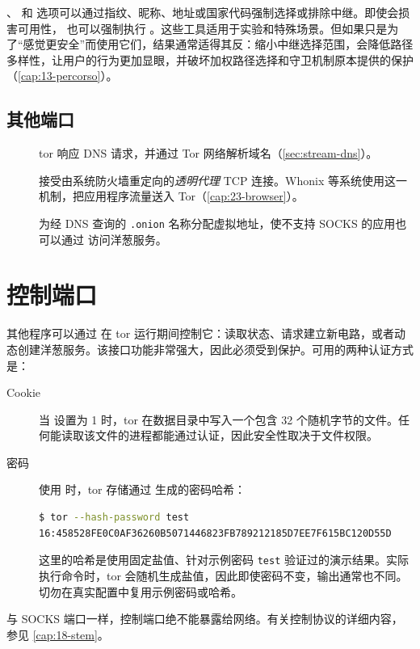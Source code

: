 、 和  选项可以通过指纹、昵称、地址或国家代码强制选择或排除中继。即使会损害可用性， 也可以强制执行 。这些工具适用于实验和特殊场景。但如果只是为了\enquote{感觉更安全}而使用它们，结果通常适得其反：缩小中继选择范围，会降低路径多样性，让用户的行为更加显眼，并破坏加权路径选择和守卫机制原本提供的保护（\cref{cap:13-percorso}）。

\subsection{其他端口}

\begin{description}
  \item[] tor 响应 DNS 请求，并通过 Tor 网络解析域名（\cref{sec:stream-dns}）。
  \item[] 接受由系统防火墙重定向的\emph{透明代理} TCP 连接。Whonix 等系统使用这一机制，把应用程序流量送入 Tor（\cref{cap:23-browser}）。
  \item[] 为经 DNS 查询的 \texttt{.onion} 名称分配虚拟地址，使不支持 SOCKS 的应用也可以通过  访问洋葱服务。
\end{description}

\section{控制端口}\label{sec:torrc-controllo}

其他程序可以通过  在 tor 运行期间控制它：读取状态、请求建立新电路，或者动态创建洋葱服务。该接口功能非常强大，因此必须受到保护。可用的两种认证方式是：
\begin{description}
  \item[Cookie] 当  设置为 1 时，tor 在数据目录中写入一个包含 32 个随机字节的文件。任何能读取该文件的进程都能通过认证，因此安全性取决于文件权限。
  \item[密码] 使用  时，tor 存储通过  生成的密码哈希：
\begin{lstlisting}[language=bash,numbers=none]
$ tor --hash-password test
16:458528FE0C0AF36260B5071446823FB789212185D7EE7F615BC120D55D
\end{lstlisting}
这里的哈希是使用固定盐值、针对示例密码 \texttt{test} 验证过的演示结果。实际执行命令时，tor 会随机生成盐值，因此即使密码不变，输出通常也不同。切勿在真实配置中复用示例密码或哈希。
\end{description}
与 SOCKS 端口一样，控制端口绝不能暴露给网络。有关控制协议的详细内容，参见 \cref{cap:18-stem}。

